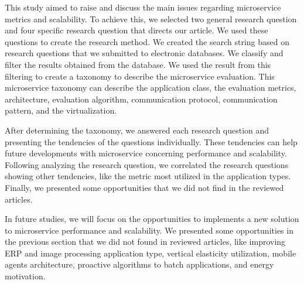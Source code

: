 This study aimed to raise and discuss the main issues regarding microservice metrics and scalability. To achieve this, we selected two general research question and four specific research question that directs our article. We used these questions to create the research method. We created the search string based on research questions that we submitted to electronic databases. We classify and filter the results obtained from the database. We used the result from this filtering to create a taxonomy to describe the microservice evaluation. This microservice taxonomy can describe the application class, the evaluation metrics, architecture, evaluation algorithm, communication protocol, communication pattern, and the virtualization. 

After determining the taxonomy, we answered each research question and presenting the tendencies of the questions individually. These tendencies can help future developments with microservice concerning performance and scalability. Following analyzing the research question, we correlated the research questions showing other tendencies, like the metric most utilized in the application types. Finally, we presented some opportunities that we did not find in the reviewed articles.

In future studies, we will focus on the opportunities to implements a new solution to microservice performance and scalability. We presented some opportunities in the previous section that we did not found in reviewed articles, like improving ERP and image processing application type, vertical elasticity utilization, mobile agents architecture, proactive algorithms to batch applications, and energy motivation.